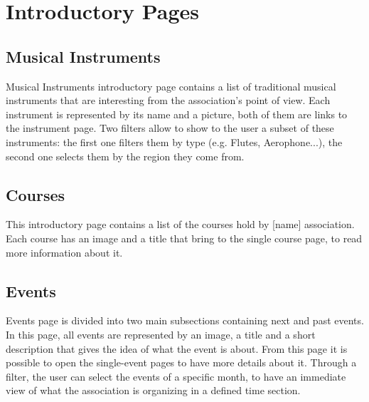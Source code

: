 \documentclass[../../DD.tex]{subfiles}
\begin{document}
\section{Introductory Pages \label{sect:2.1}}
	\subsection{Musical Instruments}
		Musical Instruments introductory page contains a list of traditional musical instruments that are interesting from the association's point of view. Each instrument is represented by its name and a picture, both of them are links to the instrument page. Two filters allow to show to the user a subset of these instruments: the first one filters them by type (e.g. Flutes, Aerophone...), the second one selects them by the region they come from.
		\newline

	\subsection{Courses}
		This introductory page contains a list of the courses hold by [name] association. Each course has an image and a title that bring to the single course page, to read more information about it.
		\newline

	\subsection{Events}
		Events page is divided into two main subsections containing next and past events. In this page, all events are represented by an image, a title and a short description that gives the idea of what the event is about. From this page it is possible to open the single-event pages to have more details about it. Through a filter, the user can select the events of a specific month, to have an immediate view of what the association is organizing in a defined time section.
		\newline

	
\end{document}
